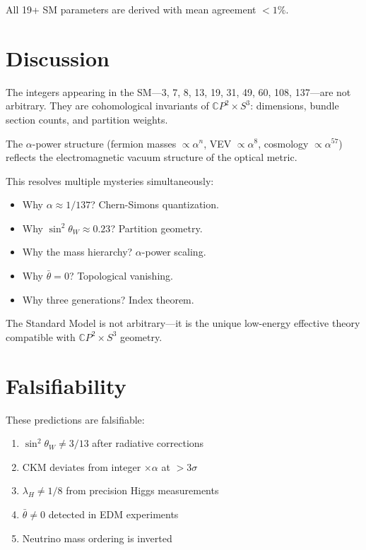 \documentclass[aps,prl,twocolumn,superscriptaddress]{revtex4-2}
\begin{document}
All 19+ SM parameters are derived with mean agreement $< 1\%$.

\section{Discussion}

The integers appearing in the SM---3, 7, 8, 13, 19, 31, 49, 60, 108, 137---are
not arbitrary. They are cohomological invariants of $\mathbb{C}P^2 \times S^3$:
dimensions, bundle section counts, and partition weights.

The $\alpha$-power structure (fermion masses $\propto \alpha^n$, VEV
$\propto \alpha^8$, cosmology $\propto \alpha^{57}$) reflects the
electromagnetic vacuum structure of the optical metric.

This resolves multiple mysteries simultaneously:
\begin{itemize}
\item Why $\alpha \approx 1/137$? Chern-Simons quantization.
\item Why $\sin^2\theta_W \approx 0.23$? Partition geometry.
\item Why the mass hierarchy? $\alpha$-power scaling.
\item Why $\bar{\theta} = 0$? Topological vanishing.
\item Why three generations? Index theorem.
\end{itemize}

The Standard Model is not arbitrary---it is the unique low-energy
effective theory compatible with $\mathbb{C}P^2 \times S^3$ geometry.

\section{Falsifiability}

These predictions are falsifiable:
\begin{enumerate}
\item $\sin^2\theta_W \neq 3/13$ after radiative corrections
\item CKM deviates from integer $\times \alpha$ at $> 3\sigma$
\item $\lambda_H \neq 1/8$ from precision Higgs measurements
\item $\bar{\theta} \neq 0$ detected in EDM experiments
\item Neutrino mass ordering is inverted
\end{enumerate}
\end{document}
